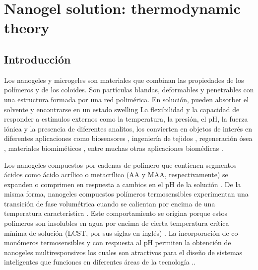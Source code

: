 \chapter{Nanogel solution: thermodynamic theory} \label{cap:mc:soluciones}
	
	\section{Introducci\'on}
	
	Los nanogeles y microgeles son materiales que combinan las propiedades de los pol\'imeros y de los coloides. Son part\'iculas blandas, deformables y penetrables con una estructura formada por una red polim\'erica. En soluci\'on, pueden absorber el solvente y encontrarse en un estado swelling \cite{karg2019nanogels,perez2021thermodynamic,lyon2012polymer}
	La flexibilidad y la capacidad de responder a est\'imulos externos como la temperatura, la presi\'on, el pH, la fuerza i\'onica y la presencia de diferentes analitos, los convierten en objetos de inter\'es en diferentes aplicaciones como biosensores \cite{zhang2012ultrathin,islam2014responsive}, ingenier\'ia de tejidos \cite{matricardi2013interpenetrating,van2011biopolymer}, regeneraci\'on \'osea \cite{bai2018bioactive}, materiales biomim\'eticos \cite{green2016mimicking,wu2010multifunctional}, entre muchas otras aplicaciones biom\'edicas \cite{Daly2020}. 
	
	Los nanogeles compuestos por cadenas de pol\'imero que contienen segmentos \'acidos como \'acido acr\'ilico o metacr\'ilico (AA y MAA, respectivamente) se expanden o comprimen  en respuesta a cambios en el pH de la soluci\'on \cite{snowden1996colloidal,Zhou1998}.
	De la misma forma, nanogeles compuestos pol\'imeros termosensibles experimentan una transici\'on de fase volum\'etrica cuando se calientan por encima de una temperatura caracter\'istica \cite{Pelton1986,Pelton2000}.
	Este comportamiento se origina porque estos pol\'imeros son insolubles en agua por encima de cierta temperatura cr\'itica m\'inima  de soluci\'on (LCST, por sus siglas en ingl\'es) \cite{Kawaguchi2020}.
	La incorporaci\'on de co-mon\'omeros termosensibles y con respuesta al pH permiten la obtenci\'on de nanogeles multiresponsivos los cuales son atractivos para el dise\~no de sistemas inteligentes que funciones en diferentes \'areas de la tecnolog\'ia \cite{plamper2017functional}..
	
